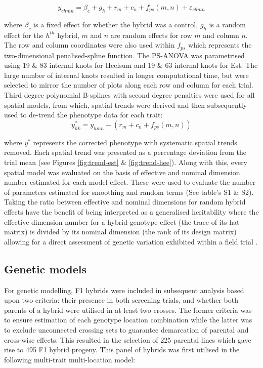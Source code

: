 \begin{equation}
y_{chmn} = \beta_c + g_h + r_m + c_n + f_{ps}(m,n) + \varepsilon_{chmn}
\label{eq:general-spline-model}
\end{equation}

where \(\beta_c\) is a fixed effect for whether the hybrid was a control, \(g_h\) is a random effect for the \(h^{th}\) hybrid, \(m\) and \(n\) are random effects for row \(m\) and column \(n\). The row and column coordinates were also used within \(f_{ps}\) which represents the two-dimensional penalised-spline function. The PS-ANOVA was parametrised using 19 \& 83 internal knots for Heelsum and 19 \& 63 internal knots for Est. The large number of internal knots resulted in longer computational time, but were selected to mirror the number of plots along each row and column for each trial. Third degree polynomial B-splines with second degree penalties were used for all spatial models, from which, spatial trends were derived and then subsequently used to de-trend the phenotype data for each trait:
\begin{equation}
y_{hk}^* = y_{hmn} - \left(r_m + c_n + f_{ps}(m,n) \right)
\label{eq:correct-values}
\end{equation}

where \(y^*\) represents the corrected phenotype with systematic spatial trends removed. Each spatial trend was presented as a percentage deviation from the trial mean (see Figures \ref{fig:trend-est} \& \ref{fig:trend-hee}). Along with this, every spatial model was evaluated on the basis of effective and nominal dimension number estimated for each model effect. These were used to evaluate the number of parameters estimated for smoothing and random terms (See table's S1 \& S2). Taking the ratio between effective and nominal dimensions for random hybrid effects have the benefit of being interpreted as a generalised heritability where the effective dimension number for a hybrid genotype effect (the trace of its hat matrix) is divided by its nominal dimension (the rank of its design matrix) allowing for a direct assessment of genetic variation exhibited within a field trial \parencite{Oakey2006}.

\subsection{Genetic models}\label{genetic-models}

For genetic modelling, F1 hybrids were included in subsequent analysis based upon two criteria: their presence in both screening trials, and whether both parents of a hybrid were utilised in at least two crosses. The former criteria was to ensure estimation of each genotype location combination while the latter was to exclude unconnected crossing sets to guarantee demarcation of parental and cross-wise effects. This resulted in the selection of 225 parental lines which gave rise to 495 F1 hybrid progeny. This panel of hybrids was first utilised in the following multi-trait multi-location model:

